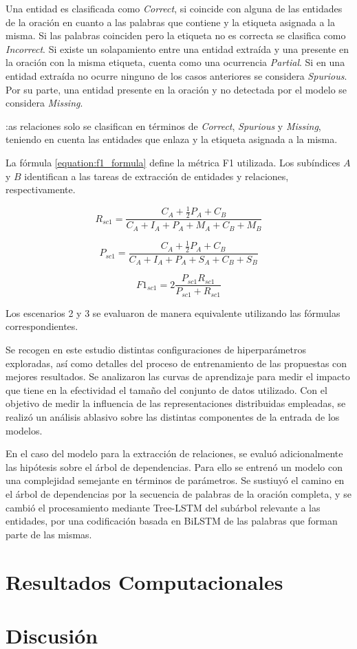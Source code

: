 Una entidad es clasificada como \textit{Correct}, si coincide con alguna de las entidades de la oración en cuanto a las palabras que contiene y la etiqueta asignada a la misma.
Si las palabras coinciden pero la etiqueta no es correcta se clasifica como \textit{Incorrect}.
Si existe un solapamiento entre una entidad extraída y una presente en la oración con la misma etiqueta, cuenta como una ocurrencia \textit{Partial}.
Si en una entidad extraída no ocurre ninguno de los casos anteriores se considera \textit{Spurious}.
Por su parte, una entidad presente en la oración y no detectada por el modelo se considera \textit{Missing}.

:as relaciones solo se clasifican en términos de \textit{Correct}, \textit{Spurious} y \textit{Missing}, teniendo en cuenta las entidades que enlaza y la etiqueta asignada a la misma.

La fórmula \ref{equation:f1_formula} define la métrica F1 utilizada.
Los subíndices $A$ y $B$ identifican a las tareas de extracción de entidades y relaciones, respectivamente.

\begin{equation*}
R_{sc1} = \frac{C_A + \frac{1}{2}P_A + C_B}{C_A + I_A + P_A + M_A + C_B + M_B}
\end{equation*}

\begin{equation*}
P_{sc1} = \frac{C_A + \frac{1}{2}P_A + C_B}{C_A + I_A + P_A + S_A + C_B + S_B}
\end{equation*}

\begin{equation}
F1_{sc1} = 2\frac{P_{sc1}R_{sc1}}{P_{sc1}+R_{sc1}}
\end{equation}\label{equation:f1_formula}

Los escenarios 2 y 3 se evaluaron de manera equivalente utilizando las fórmulas correspondientes.

Se recogen en este estudio distintas configuraciones de hiperparámetros exploradas, así como detalles del proceso de entrenamiento de las propuestas con mejores resultados.
Se analizaron las curvas de aprendizaje para medir el impacto que tiene en la efectividad el tamaño del conjunto de datos utilizado.
Con el objetivo de medir la influencia de las representaciones distribuidas empleadas, se realizó un análisis ablasivo sobre las distintas componentes de la entrada de los modelos.

En el caso del modelo para la extracción de relaciones, se evaluó adicionalmente las hipótesis sobre el árbol de dependencias.
Para ello se entrenó un modelo con una complejidad semejante en términos de parámetros.
Se sustiuyó el camino en el árbol de dependencias por la secuencia de palabras de la oración completa, y se cambió el procesamiento mediante Tree-LSTM del subárbol relevante a las entidades, por una codificación basada en BiLSTM de las palabras que forman parte de las mismas.


\section{Resultados Computacionales}

\section{Discusión}
